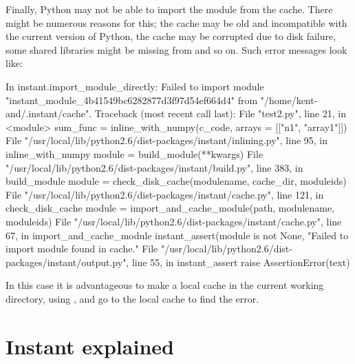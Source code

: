 Finally, Python may not be able to import the module from the
cache. There might be numerous reasons for this; the cache may be old
and incompatible with the current version of Python, the cache may be
corrupted due to disk failure, some shared libraries might be missing
from  and so on.  Such error messages look
like:
\begin{progoutput}
In instant.import_module_directly:
Failed to import module "instant_module_4b41549bc6282877d3f97d54ef664d4" from "/home/kent-and/.instant/cache".
Traceback (most recent call last):
  File "test2.py", line 21, in <module>
    sum_func = inline_with_numpy(c_code, arrays = [["n1", "array1"]])
  File "/usr/local/lib/python2.6/dist-packages/instant/inlining.py", line 95, in inline_with_numpy
    module = build_module(**kwargs)
  File "/usr/local/lib/python2.6/dist-packages/instant/build.py", line 383, in build_module
    module = check_disk_cache(modulename, cache_dir, moduleids)
  File "/usr/local/lib/python2.6/dist-packages/instant/cache.py", line 121, in check_disk_cache
    module = import_and_cache_module(path, modulename, moduleids)
  File "/usr/local/lib/python2.6/dist-packages/instant/cache.py", line 67, in import_and_cache_module
    instant_assert(module is not None, "Failed to import module found in cache."
  File "/usr/local/lib/python2.6/dist-packages/instant/output.py", line 55, in instant_assert
    raise AssertionError(text)
\end{progoutput}
In this case it is advantageous to make a local cache in the current working directory, using , and go
to the local cache to find the error.

\section{Instant explained}
\label{wilbers:sec:explained}

